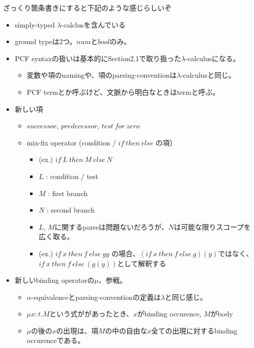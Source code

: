 \documentclass[9pt,fleqn]{jarticle}
\begin{document}
ざっくり箇条書きにすると下記のような感じらしいぞ
\begin{itemize}
	\item simply-typed $\lambda$-calclusを含んでいる
	\item ground typeは2つ。$num$と$bool$のみ。
	\item PCF syntaxの扱いは基本的にSection2.1で取り扱った$\lambda$-calculusになる。
		\begin{itemize}
			\item 変数や項のnamingや、項のparsing-conventionは$\lambda$-calculusと同じ。
			\item PCF termとか呼ぶけど、文脈から明白なときはtermと呼ぶ。
		\end{itemize}
	\item 新しい項
		\begin{itemize}
			\item $successor$, $predecessor$, $test\ for\ zero$
			\item mix-fix operator (condition / $if\ then\ else$ の項）
				\begin{itemize}
					\item (ex.) $if\ L\ then\ M\ else\ N$
					\item $L$ : condition / test
					\item $M$ : first branch
					\item $N$ : second branch
					\item $L$, $M$に関するparseは問題ないだろうが、$N$は可能な限りスコープを広く取る。
					\item (ex.) $if\ x\ then\ f\ else\ gy$ の場合、$(if\ x\ then\ f\ else\ g)(y)$ではなく、 $if\ x\ then\ f\ else\ (g(y))$として解釈する
				\end{itemize}
		\end{itemize}
	\item 新しいbinding operatorの$\mu$、参戦。
		\begin{itemize}
			\item $\alpha$-equivalenceとparsing-conventionの定義は$\lambda$と同じ感じ。
			\item $\mu x:t.M$という式ががあったとき、$x$がbinding occurence, $M$がbody
			\item $\mu$の後の$x$の出現は、項$M$の中の自由な$x$全ての出現に対するbinding occurenceである。
		\end{itemize}
\end{itemize}
\end{document}
